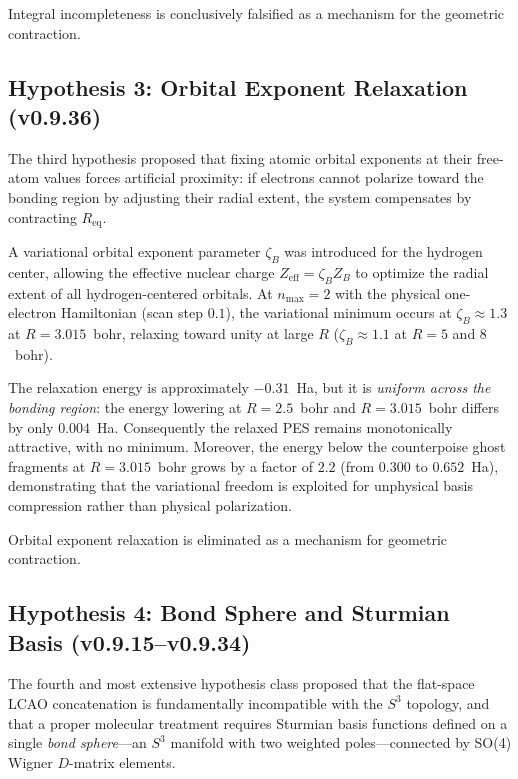 \documentclass[aps,pra,twocolumn,superscriptaddress,longbibliography]{revtex4-2}
\begin{document}
Integral incompleteness is conclusively falsified as a mechanism for the
geometric contraction.

\subsection{Hypothesis 3: Orbital Exponent Relaxation (v0.9.36)}
\label{sec:hyp_relaxation}

The third hypothesis proposed that fixing atomic orbital exponents at
their free-atom values forces artificial proximity: if electrons cannot
polarize toward the bonding region by adjusting their radial extent, the
system compensates by contracting $R_{\mathrm{eq}}$.

A variational orbital exponent parameter $\zeta_B$ was introduced for
the hydrogen center, allowing the effective nuclear charge
$Z_{\mathrm{eff}} = \zeta_B Z_B$ to optimize the radial extent of all
hydrogen-centered orbitals.  At $n_{\max}=2$ with the physical
one-electron Hamiltonian (scan step $0.1$), the variational minimum
occurs at $\zeta_B \approx 1.3$ at $R=3.015$~bohr, relaxing toward
unity at large $R$ ($\zeta_B \approx 1.1$ at $R=5$ and $8$~bohr).

The relaxation energy is approximately $-0.31$~Ha, but it is
\emph{uniform across the bonding region}: the energy lowering at
$R=2.5$~bohr and $R=3.015$~bohr differs by only $0.004$~Ha.
Consequently the relaxed PES remains monotonically attractive, with no
minimum.  Moreover, the energy below the counterpoise ghost fragments at
$R=3.015$~bohr grows by a factor of $2.2$ (from $0.300$ to
$0.652$~Ha), demonstrating that the variational freedom is exploited
for unphysical basis compression rather than physical polarization.

Orbital exponent relaxation is eliminated as a mechanism for geometric
contraction.

\subsection{Hypothesis 4: Bond Sphere and Sturmian Basis
(v0.9.15--v0.9.34)}
\label{sec:hyp_sturmian}

The fourth and most extensive hypothesis class proposed that the
flat-space LCAO concatenation is fundamentally incompatible with the
$S^3$ topology, and that a proper molecular treatment requires Sturmian
basis functions defined on a single \emph{bond sphere}---an $S^3$
manifold with two weighted poles---connected by SO(4) Wigner $D$-matrix
elements.
\end{document}
